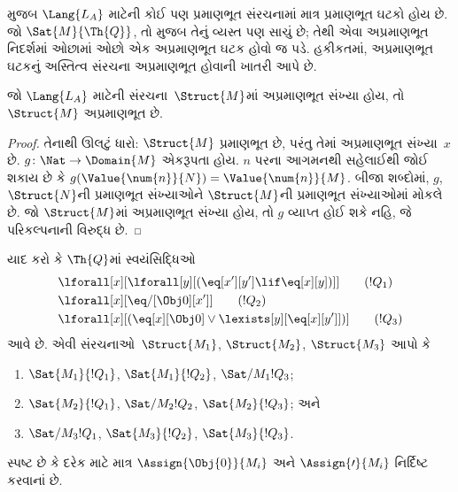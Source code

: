 \begin{explain}
 મુજબ $\Lang{L_A}$ માટેની કોઈ પણ
પ્રમાણભૂત સંરચનામાં માત્ર પ્રમાણભૂત ઘટકો હોય છે. જો
$\Sat{M}{\Th{Q}}$, તો  મુજબ તેનું
વ્યસ્ત પણ સાચું છે; તેથી એવા અપ્રમાણભૂત નિદર્શમાં ઓછામાં ઓછો એક
અપ્રમાણભૂત ઘટક હોવો જ પડે.
હકીકતમાં, અપ્રમાણભૂત ઘટકનું અસ્તિત્વ સંરચના અપ્રમાણભૂત હોવાની
ખાતરી આપે છે.
\end{explain}

\begin{prop}
જો $\Lang{L_A}$ માટેની સંરચના~$\Struct{M}$માં અપ્રમાણભૂત
સંખ્યા હોય, તો $\Struct{M}$ અપ્રમાણભૂત છે.
\end{prop}

\begin{proof}
તેનાથી ઊલટું ધારો: $\Struct{M}$ પ્રમાણભૂત છે, પરંતુ તેમાં અપ્રમાણભૂત
સંખ્યા~$x$ છે. $g\colon\Nat\to\Domain{M}$ એકરૂપતા હોય. $n$ પરના
આગમનથી સહેલાઈથી જોઈ શકાય છે કે
$g(\Value{\num{n}}{N})=\Value{\num{n}}{M}$. બીજા શબ્દોમાં, $g$,
$\Struct{N}$ની પ્રમાણભૂત સંખ્યાઓને $\Struct{M}$ની પ્રમાણભૂત
સંખ્યાઓમાં મોકલે છે. જો $\Struct{M}$માં અપ્રમાણભૂત સંખ્યા હોય, તો
$g$ વ્યાપ્ત હોઈ શકે નહિ, જે પરિકલ્પનાની વિરુદ્ધ છે.
\end{proof}

\begin{prob}
યાદ કરો કે $\Th{Q}$માં સ્વયંસિદ્ધિઓ
\begin{align*}
& \lforall[x][\lforall[y][(\eq[x'][y'] \lif \eq[x][y])]] \tag{$!Q_1$}\\
& \lforall[x][\eq/[\Obj 0][x']] \tag{$!Q_2$}\\
& \lforall[x][(\eq[x][\Obj 0] \lor \lexists[y][\eq[x][y']])] \tag{$!Q_3$}
\end{align*}
આવે છે. એવી સંરચનાઓ~$\Struct{M_1}$, $\Struct{M_2}$,
$\Struct{M_3}$ આપો કે
\begin{enumerate}
\item $\Sat{M_1}{!Q_1}$, $\Sat{M_1}{!Q_2}$, $\Sat/{M_1}{!Q_3}$;
\item $\Sat{M_2}{!Q_1}$, $\Sat/{M_2}{!Q_2}$, $\Sat{M_2}{!Q_3}$; અને
\item $\Sat/{M_3}{!Q_1}$, $\Sat{M_3}{!Q_2}$, $\Sat{M_3}{!Q_3}$.
\end{enumerate}
સ્પષ્ટ છે કે દરેક માટે માત્ર $\Assign{\Obj{0}}{M_i}$ અને
$\Assign{\prime}{M_i}$ નિર્દિષ્ટ કરવાનાં છે.
\end{prob}

